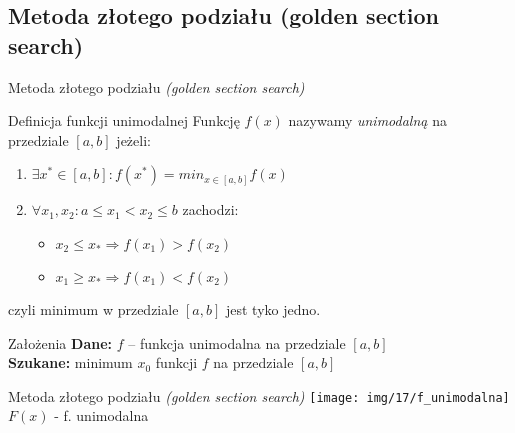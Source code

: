 \subsection{Metoda złotego podziału (golden section search)}
    \begin{frame}{Metoda złotego podziału \emph{(golden section search)}}
    \begin{block}{Definicja funkcji unimodalnej}
      Funkcję $f(x)$ nazywamy \emph{unimodalną} na przedziale
      $[a{,}b]$ jeżeli:
      \begin{enumerate}
        \item $\exists x^{*}\in [a{,}b] : f(x^{*}) = min_{x \in [a{,}b]}f(x)$
        \item $\forall x_{1}{,}x_{2} : a \leq x_{1} < x_{2} \leq b$ zachodzi:
        \begin{itemize}
          \item $x_{2} \leq x_{*} \Rightarrow f(x_{1}) > f(x_{2})$
          \item $x_{1} \geq x_{*} \Rightarrow f(x_{1}) < f(x_{2})$
        \end{itemize}
      \end{enumerate}
    \end{block}
    czyli  minimum w przedziale $[a,b]$ jest tyko jedno.
    \begin{block}{Założenia}
      \textbf{Dane:} $f$ -- funkcja unimodalna na przedziale $[a, b]$\\
      \textbf{Szukane:} minimum $x_0$ funkcji $f$ na przedziale $[a, b]$
    \end{block}
  \end{frame}

  \begin{frame}{Metoda złotego podziału \emph{(golden section search)}}
    \texttt{[image: img/17/f\_unimodalna]}
    \\
    $F(x)$ - f. unimodalna
  \end{frame}


